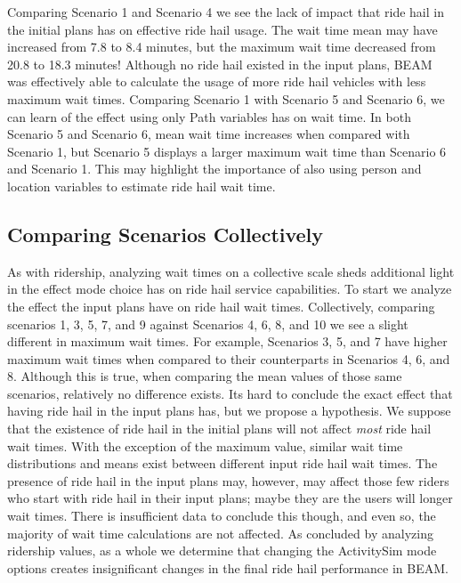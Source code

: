 \documentclass[12pt, oneside, openright]{byuthesis}
\begin{document}
Comparing Scenario 1 and Scenario 4 we see the lack of impact that ride hail in the initial plans has on effective ride hail usage. The wait time mean may have increased from 7.8 to 8.4 minutes, but the maximum wait time decreased from 20.8 to 18.3 minutes! Although no ride hail existed in the input plans, BEAM was effectively able to calculate the usage of more ride hail vehicles with less maximum wait times. Comparing Scenario 1 with Scenario 5 and Scenario 6, we can learn of the effect using only Path variables has on wait time. In both Scenario 5 and Scenario 6, mean wait time increases when compared with Scenario 1, but Scenario 5 displays a larger maximum wait time than Scenario 6 and Scenario 1. This may highlight the importance of also using person and location variables to estimate ride hail wait time.

\hypertarget{comparing-scenarios-collectively}{%
\subsection{Comparing Scenarios Collectively}\label{comparing-scenarios-collectively}}

As with ridership, analyzing wait times on a collective scale sheds additional light in the effect mode choice has on ride hail service capabilities. To start we analyze the effect the input plans have on ride hail wait times. Collectively, comparing scenarios 1, 3, 5, 7, and 9 against Scenarios 4, 6, 8, and 10 we see a slight different in maximum wait times. For example, Scenarios 3, 5, and 7 have higher maximum wait times when compared to their counterparts in Scenarios 4, 6, and 8. Although this is true, when comparing the mean values of those same scenarios, relatively no difference exists. Its hard to conclude the exact effect that having ride hail in the input plans has, but we propose a hypothesis. We suppose that the existence of ride hail in the initial plans will not affect \emph{most} ride hail wait times. With the exception of the maximum value, similar wait time distributions and means exist between different input ride hail wait times. The presence of ride hail in the input plans may, however, may affect those few riders who start with ride hail in their input plans; maybe they are the users will longer wait times. There is insufficient data to conclude this though, and even so, the majority of wait time calculations are not affected. As concluded by analyzing ridership values, as a whole we determine that changing the ActivitySim mode options creates insignificant changes in the final ride hail performance in BEAM.
\end{document}
